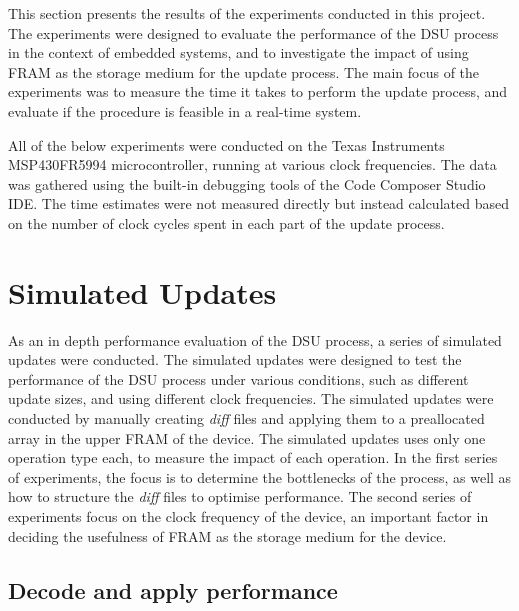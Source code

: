 This section presents the results of the experiments conducted in this project. The experiments were designed to evaluate the performance of the DSU process in the context of embedded systems, and to investigate the impact of using FRAM as the storage medium for the update process. The main focus of the experiments was to measure the time it takes to perform the update process, and evaluate if the procedure is feasible in a real-time system.

All of the below experiments were conducted on the Texas Instruments MSP430FR5994 microcontroller, running at various clock frequencies. The data was gathered using the built-in debugging tools of the Code Composer Studio IDE. The time estimates were not measured directly but instead calculated based on the number of clock cycles spent in each part of the update process. 

\section{Simulated Updates}
As an in depth performance evaluation of the DSU process, a series of simulated updates were conducted. The simulated updates were designed to test the performance of the DSU process under various conditions, such as different update sizes, and using different clock frequencies. The simulated updates were conducted by manually creating \textit{diff} files and applying them to a preallocated array in the upper FRAM of the device. The simulated updates uses only one operation type each, to measure the impact of each operation. In the first series of experiments, the focus is to determine the bottlenecks of the process, as well as how to structure the \textit{diff} files to optimise performance. The second series of experiments focus on the clock frequency of the device, an important factor in deciding the usefulness of FRAM as the storage medium for the device.
\subsection{Decode and apply performance}
